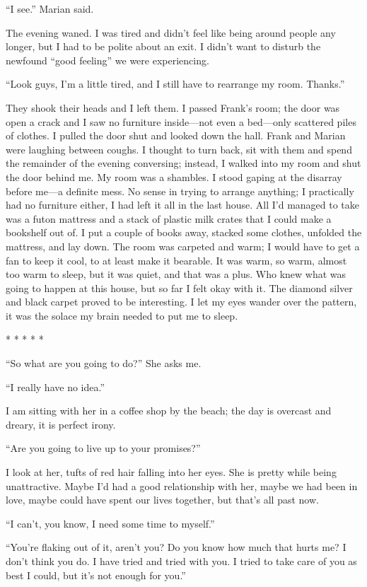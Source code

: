 ``I see.'' Marian said.

The evening waned. I was tired and didn't feel like being around people
any longer, but I had to be polite about an exit. I didn't want to
disturb the newfound ``good feeling'' we were experiencing.

``Look guys, I'm a little tired, and I still have to rearrange my room.
Thanks.''

They shook their heads and I left them. I passed Frank's room; the door
was open a crack and I saw no furniture inside---not even a bed---only
scattered piles of clothes. I pulled the door shut and looked down the
hall. Frank and Marian were laughing between coughs. I thought to turn
back, sit with them and spend the remainder of the evening conversing;
instead, I walked into my room and shut the door behind me. My room was
a shambles. I stood gaping at the disarray before me---a definite mess.
No sense in trying to arrange anything; I practically had no furniture
either, I had left it all in the last house. All I'd managed to take was
a futon mattress and a stack of plastic milk crates that I could make a
bookshelf out of. I put a couple of books away, stacked some clothes,
unfolded the mattress, and lay down. The room was carpeted and warm; I
would have to get a fan to keep it cool, to at least make it bearable.
It was warm, so warm, almost too warm to sleep, but it was quiet, and
that was a plus. Who knew what was going to happen at this house, but so
far I felt okay with it. The diamond silver and black carpet proved to
be interesting. I let my eyes wander over the pattern, it was the solace
my brain needed to put me to sleep.

* * * * *

``So what are you going to do?'' She asks me.

``I really have no idea.''

I am sitting with her in a coffee shop by the beach; the day is overcast
and dreary, it is perfect irony.

``Are you going to live up to your promises?''

I look at her, tufts of red hair falling into her eyes. She is pretty
while being unattractive. Maybe I'd had a good relationship with her,
maybe we had been in love, maybe could have spent our lives together,
but that's all past now.

``I can't, you know, I need some time to myself.''

``You're flaking out of it, aren't you? Do you know how much that hurts
me? I don't think you do. I have tried and tried with you. I tried to
take care of you as best I could, but it's not enough for you.''

